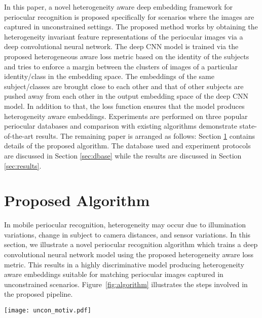 \documentclass[10pt,twocolumn,letterpaper]{article}
\begin{document}
In this paper, a novel heterogeneity aware deep embedding framework for periocular recognition is proposed specifically for scenarios where the images are captured in unconstrained settings. The proposed method works by obtaining the heterogeneity invariant feature representations of the periocular images via a deep convolutional neural network. The deep CNN model is trained via the proposed heterogeneous aware loss metric based on the identity of the subjects and tries to enforce a margin between the clusters of images of a particular identity/class in the embedding space. The embeddings of the same subject/classes are brought close to each other and that of other subjects are pushed away from each other in the output embedding space of the deep CNN model. In addition to that, the loss function ensures that the model produces heterogeneity aware embeddings. Experiments are performed on three popular periocular databases and comparison with existing algorithms  demonstrate state-of-the-art results. The remaining paper is arranged as follows: Section \ref{sec:proposed} contains details of the proposed algorithm. The database used and experiment protocols are discussed in Section \ref{sec:dbase} while the results are discussed in Section \ref{sec:results}.   



\section{Proposed Algorithm}
\label{sec:proposed}
In mobile periocular recognition, heterogeneity may occur due to illumination variations, change in subject to camera distances, and sensor variations. In this section, we illustrate a novel periocular recognition algorithm which trains a deep convolutional neural network model using the proposed heterogeneity aware loss metric. This results in a highly discriminative model producing heterogeneity aware embeddings suitable for matching periocular images captured in unconstrained scenarios. Figure~\ref{fig:algorithm} illustrates the steps involved in the proposed pipeline.  


\begin{figure*}
  \centering
  \texttt{[image: uncon\_motiv.pdf]}

  \caption{Training the proposed model: periocular images pertaining to different identities are utilized to forward pass through the deep CNN model with shared weights. During training, the loss function (Figure~\ref{fig:hetero_loss}) optimizes the feature representations so that the ones of the same identity are close to each other (i.e. reduce intra-class variations) while others are pushed further apart in the output embedding space of the deep CNN model. $a$ and $b$ refer to different subjects and domain 1 and 2 refer to different image capture scenarios such as indoor/outdoor and with flash/without flash.}
    \vspace{-12pt}
  \label{fig:algorithm}
\end{figure*}
\end{document}
